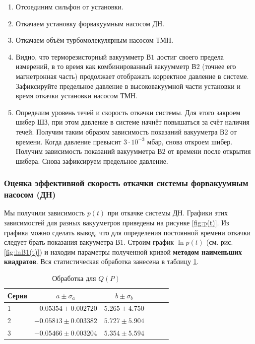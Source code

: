 \documentclass[12pt,a4paper]{article}
\begin{document}
\begin{enumerate}
	\item Отсоединим сильфон от установки.
	\item Откачаем установку форвакуумным насосом ДН.
	\item Откачаем объём турбомолекулярным насосом ТМН.
	\item Видно, что терморезисторный вакуумметр $В1$ достиг своего предела измерений, в то время как комбинированный вакуумметр $В2$ (точнее его магнетронная часть) продолжает отображать корректное давление в системе. Зафиксируйте предельное давление в высоковакуумной части установки и время откачки установки насосом ТМН.
	\item Определим уровень течей и скорость откачки системы. Для этого закроем шибер ШЗ, при этом давление в системе начнёт повышаться за счёт наличия течей. Получим таким образом зависимость показаний вакууметра $В2$ от времени. Когда давление превысит $3 \cdot 10^{-3}$ мбар,
	снова откроем шибер. Получим зависимость показаний вакуумметра $В2$ от времени после открытия шибера. Снова зафиксируем предельное давление.
\end{enumerate}

\subsubsection*{Оценка эффективной скорость откачки системы форвакуумным насосом (ДН)}
Мы получили зависимость $p(t)$ при откачке системы ДН. Графики этих зависимостей для разных вакууметров приведены на рисунке \ref{fig:p(t)}. Из графика можно сделать вывод, что для определения постоянной времени откачки следует брать показания вакууметра В1. Строим график $\ln{p}(t)$ (см. рис. \ref{fig:lnB1(t)}) и находим параметры полученной кривой \textbf{методом наименьших квадратов}. Вся статистическая обработка занесена в таблицу \ref{tab:lnB1(t)_stat}.

\begin{table}[H]
	
	\caption{Обработка для $Q(P)$}
	\label{tab:lnB1(t)_stat}
	\centering
	\footnotesize
	\begin{tabular}{lccccc}
		\toprule
		
		Серия & $a \pm \sigma_a$ & $b \pm \sigma_b$ \\
		\midrule
		1 & $-0.05354 \pm 0.002720$     &    $5.265 \pm 4.750$ \\ 
		2 & $-0.05813 \pm 0.003382$     &    $5.727 \pm 5.904$ \\
		3 & $-0.05466 \pm 0.003204$     &    $5.354 \pm 5.594$ \\ 
		\bottomrule
	\end{tabular}
\end{table}
\end{document}
